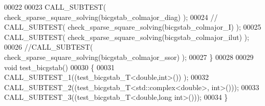 \begin{DoxyCode}
00022   
00023   CALL\_SUBTEST( check\_sparse\_square\_solving(bicgstab\_colmajor\_diag)  );
00024 \textcolor{comment}{//   CALL\_SUBTEST( check\_sparse\_square\_solving(bicgstab\_colmajor\_I)     );}
00025   CALL\_SUBTEST( check\_sparse\_square\_solving(bicgstab\_colmajor\_ilut)     );
00026   \textcolor{comment}{//CALL\_SUBTEST( check\_sparse\_square\_solving(bicgstab\_colmajor\_ssor)     );}
00027 \}
00028 
00029 \textcolor{keywordtype}{void} test\_bicgstab()
00030 \{
00031   CALL\_SUBTEST\_1((test\_bicgstab\_T<double,int>()) );
00032   CALL\_SUBTEST\_2((test\_bicgstab\_T<std::complex<double>, \textcolor{keywordtype}{int}>()));
00033   CALL\_SUBTEST\_3((test\_bicgstab\_T<double,long int>()));
00034 \}
\end{DoxyCode}
